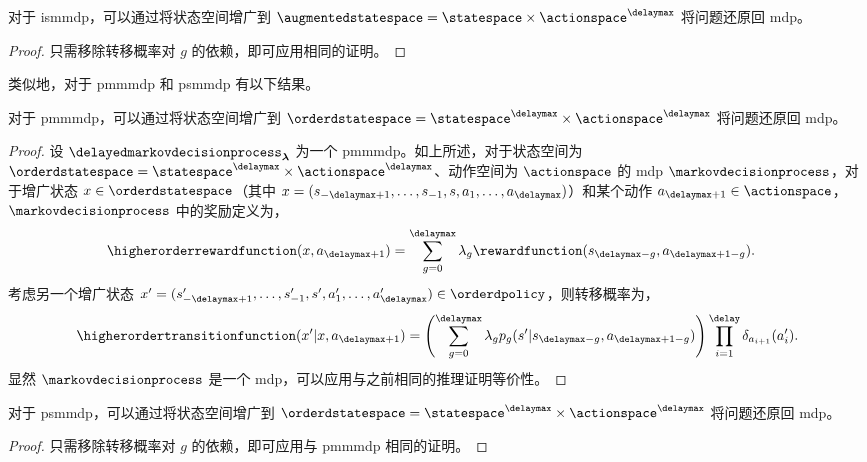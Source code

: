 \begin{prop}
\label{prop:equ_mdp_is_mtdmdp}
    对于 \gls{ismmdp}，可以通过将状态空间增广到 $\augmentedstatespace=\statespace\times\actionspace^\delaymax$ 将问题还原回 \gls{mdp}。
\end{prop}
\begin{proof}
    只需移除转移概率对 $g$ 的依赖，即可应用相同的证明。
\end{proof}

类似地，对于 \gls{pmmmdp} 和 \gls{psmmdp} 有以下结果。

\begin{prop}
\label{prop:equ_mdp_pm_mtdmdp}
    对于 \gls{pmmmdp}，可以通过将状态空间增广到 $\orderdstatespace=\statespace^{\delaymax}\times\actionspace^{\delaymax}$ 将问题还原回 \gls{mdp}。
\end{prop}
\begin{proof}
    设 $\delayedmarkovdecisionprocess_{\boldsymbol\lambda}$ 为一个 \gls{pmmmdp}。如上所述，对于状态空间为 $\orderdstatespace=\statespace^{\delaymax}\times\actionspace^{\delaymax}$、动作空间为 $\actionspace$ 的 \gls{mdp} $\markovdecisionprocess$，对于增广状态 $x\in\orderdstatespace$（其中 $x=(s_{-\delaymax+1},\dots,s_{-1},s,a_1,\dots,a_\delaymax)$）和某个动作 $a_{\delaymax+1}\in\actionspace$，$\markovdecisionprocess$ 中的奖励定义为，
    \begin{align*}
        \higherorderrewardfunction(x,a_{\delaymax+1})
        &= \sum_{g=0}^{\delaymax} \lambda_{g} \rewardfunction(s_{\delaymax-g},a_{\delaymax+1-g}).
    \end{align*}
    考虑另一个增广状态 $x'=(s_{-\delaymax+1}',\dots,s_{-1}',s',a_1',\dots,a_\delaymax')\in\orderdpolicy$，则转移概率为，
    \begin{align*}
        \higherordertransitionfunction(x'\vert x,a_{\delaymax+1}) = \left(\sum_{g=0}^{\delaymax}\lambda_g p_{g}(s'\vert s_{\delaymax-g},a_{\delaymax+1-g})\right)\prod_{i=1}^{\delay}\delta_{a_{i+1}}(a_{i}').
    \end{align*}
    显然 $\markovdecisionprocess$ 是一个 \gls{mdp}，可以应用与之前相同的推理证明等价性。
\end{proof}


\begin{prop}
\label{prop:equ_mdp_ps_mtdmdp}
    对于 \gls{psmmdp}，可以通过将状态空间增广到 $\orderdstatespace=\statespace^{\delaymax}\times\actionspace^{\delaymax}$ 将问题还原回 \gls{mdp}。
\end{prop}
\begin{proof}
    只需移除转移概率对 $g$ 的依赖，即可应用与 \gls{pmmmdp} 相同的证明。
\end{proof}


